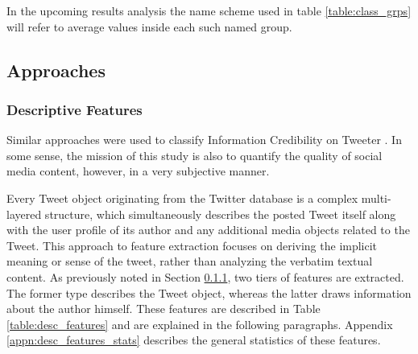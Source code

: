 		In the upcoming results analysis the name scheme used in table \ref{table:class_grps} will refer to average values inside each such named group. 
	
	\subsection{Approaches}
		\label{section:feature_types}
		\subsubsection{Descriptive Features}
			\label{section:Descriptive_Features}
			Similar approaches were used to classify Information Credibility on Tweeter \cite{castillo2011information}. In some sense, the mission of this study is also to quantify the quality of social media content, however, in a very subjective manner.
			\par	
		
			Every Tweet object originating from the Twitter database is a complex multi-layered structure, which  simultaneously describes the posted Tweet itself along with the user profile of its author and any additional media objects related to the Tweet. This approach to feature extraction focuses on deriving the implicit meaning or sense of the tweet, rather than analyzing the verbatim textual content. As previously noted in Section \ref{section:Descriptive_Features}, two tiers of features are extracted. The former type describes the Tweet object, whereas the latter draws information about the author himself. These features are described in Table \ref{table:desc_features} and are explained in the following paragraphs. Appendix \ref{appn:desc_features_stats} describes the general statistics of these features. 
			
